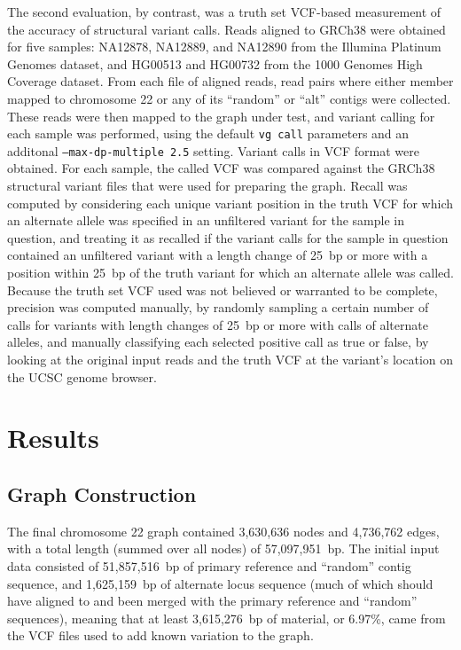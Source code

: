 The second evaluation, by contrast, was a truth set VCF-based measurement of the accuracy of structural variant calls. Reads aligned to GRCh38 were obtained for five samples: NA12878, NA12889, and NA12890 from the Illumina Platinum Genomes dataset, and HG00513 and HG00732 from the 1000 Genomes High Coverage dataset. From each file of aligned reads, read pairs where either member mapped to chromosome 22 or any of its ``random'' or ``alt'' contigs were collected. These reads were then mapped to the graph under test, and variant calling for each sample was performed, using the default \texttt{vg call} parameters and an additonal \texttt{--max-dp-multiple 2.5} setting. Variant calls in VCF format were obtained. For each sample, the called VCF was compared against the GRCh38 structural variant files that were used for preparing the graph. Recall was computed by considering each unique variant position in the truth VCF for which an alternate allele was specified in an unfiltered variant for the sample in question, and treating it as recalled if the variant calls for the sample in question contained an unfiltered variant with a length change of 25~bp or more with a position within 25~bp of the truth variant for which an alternate allele was called. Because the truth set VCF used was not believed or warranted to be complete, precision was computed manually, by randomly sampling a certain number of calls for variants with length changes of 25~bp or more with calls of alternate alleles, and manually classifying each selected positive call as true or false, by looking at the original input reads and the truth VCF at the variant's location on the UCSC genome browser.

\section{Results}

\subsection{Graph Construction}

The final chromosome 22 graph contained 3,630,636 nodes and 4,736,762 edges, with a total length (summed over all nodes) of 57,097,951~bp. The initial input data consisted of 51,857,516~bp of primary reference and ``random'' contig sequence, and 1,625,159~bp of alternate locus sequence (much of which should have aligned to and been merged with the primary reference and ``random'' sequences), meaning that at least 3,615,276~bp of material, or 6.97\%, came from the VCF files used to add known variation to the graph. %

